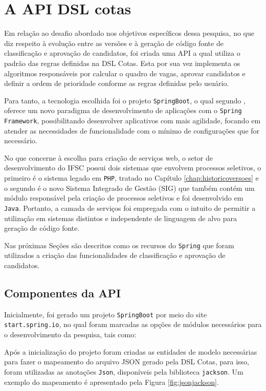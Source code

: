 \section{A API DSL cotas}
\label{apicotas}

Em relação ao desafio abordado nos objetivos específicos dessa pesquisa, no que diz respeito à evolução entre as versões e à geração de código fonte de classificação e aprovação de candidatos, foi criada uma \gls{API} a qual utiliza o padrão das regras definidas na DSL Cotas. Esta por sua vez implementa os algoritmos responsáveis por calcular o quadro de vagas, aprovar candidatos e definir a ordem de prioridade conforme as regras definidas pelo usuário.


Para tanto, a tecnologia escolhida foi o projeto \texttt{SpringBoot}, o qual segundo , oferece um novo paradigma de desenvolvimento de aplicações com o \texttt{Spring Framework}, possibilitando desenvolver aplicativos com mais agilidade, focando em atender as necessidades de funcionalidade com o mínimo de configurações que for necessário.

No que concerne à escolha para criação de serviços web, o setor de desenvolvimento do \gls{IFSC} possui dois sistemas que envolvem processos seletivos, o primeiro é o sistema legado em \texttt{PHP}, tratado no Capítulo \ref{chap:historicoversoes} e o segundo é o novo Sistema Integrado de Gestão (SIG) que também contém um módulo responsável pela criação de processos seletivos e foi desenvolvido em \texttt{Java}. Portanto, a camada de serviços foi empregada com o intuito de permitir a utilização em sistemas distintos e independente de linguagem de alvo para geração de código fonte.


Nas próximas Seções são descritos como os recursos do \texttt{Spring} que foram utilizados a criação das funcionalidades de classificação e aprovação de candidatos.


\subsection{Componentes da API}
\label{componentesapi}

Inicialmente, foi gerado um projeto \texttt{SpringBoot} por meio do site \texttt{start.spring.io}, no qual foram marcadas as opções de módulos necessários para o desenvolvimento da pesquisa, tais como:



Após a inicialização do projeto foram criadas as entidades de modelo necessárias para fazer o mapeamento do arquivo JSON gerado pela DSL Cotas, para isso, foram utilizadas as anotações \texttt{Json}, disponíveis pela biblioteca \texttt{jackson}. Um exemplo do mapeamento é apresentado pela Figura \ref{fig:jsonjackson}. 

